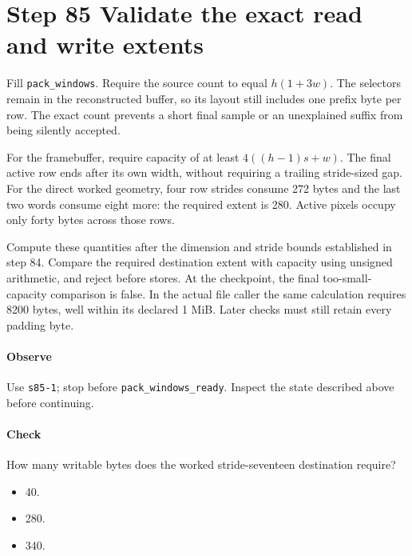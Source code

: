\section{Step 85 Validate the exact read and write extents}
Fill \texttt{pack\_windows}. Require the source count to equal $h(1+3w)$. The selectors remain in the reconstructed buffer, so its layout still includes one prefix byte per row. The exact count prevents a short final sample or an unexplained suffix from being silently accepted.

For the framebuffer, require capacity of at least $4((h-1)s+w)$. The final active row ends after its own width, without requiring a trailing stride-sized gap. For the direct worked geometry, four row strides consume 272 bytes and the last two words consume eight more: the required extent is 280. Active pixels occupy only forty bytes across those rows.

Compute these quantities after the dimension and stride bounds established in step 84. Compare the required destination extent with capacity using unsigned arithmetic, and reject before stores. At the checkpoint, the final too-small-capacity comparison is false. In the actual file caller the same calculation requires 8200 bytes, well within its declared 1 MiB. Later checks must still retain every padding byte.

\paragraph{Observe} Use \texttt{s85-1}; stop before \texttt{pack\_windows\_ready}. Inspect the state described above before continuing.

\paragraph{Check} How many writable bytes does the worked stride-seventeen destination require?
\begin{itemize}
  \item[A.] 40.
  \item[B.] 280.
  \item[C.] 340.
\end{itemize}
